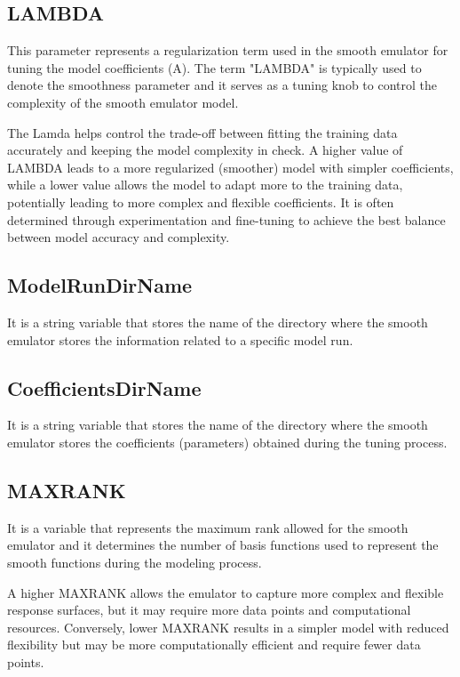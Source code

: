 \documentclass[12pt]{article}
\numberwithin{equation}{section}
\numberwithin{figure}{section}
\begin{document}
\subsection{LAMBDA}

This parameter represents a regularization term used in the smooth emulator for tuning the model coefficients (A). The term "LAMBDA" is typically used to denote the smoothness parameter and it serves as a tuning knob to control the complexity of the smooth emulator model.

The Lamda helps control the trade-off between fitting the training data accurately and keeping the model complexity in check. A higher value of LAMBDA leads to a more regularized (smoother) model with simpler coefficients, while a lower value allows the model to adapt more to the training data, potentially leading to more complex and flexible coefficients. It is often determined through experimentation and fine-tuning to achieve the best balance between model accuracy and complexity.

\subsection{ModelRunDirName}
It is a string variable that stores the name of the directory where the smooth emulator stores the information related to a specific model run.    \\

\subsection{CoefficientsDirName} 
It is a string variable that stores the name of the directory where the smooth emulator stores the coefficients (parameters) obtained during the tuning process.   \\

\subsection{MAXRANK}

It is a variable that represents the maximum rank allowed for the smooth emulator and it determines the number of basis functions used to represent the smooth functions during the modeling process. 

A higher MAXRANK allows the emulator to capture more complex and flexible response surfaces, but it may require more data points and computational resources. Conversely, lower MAXRANK results in a simpler model with reduced flexibility but may be more computationally efficient and require fewer data points.
\end{document}
